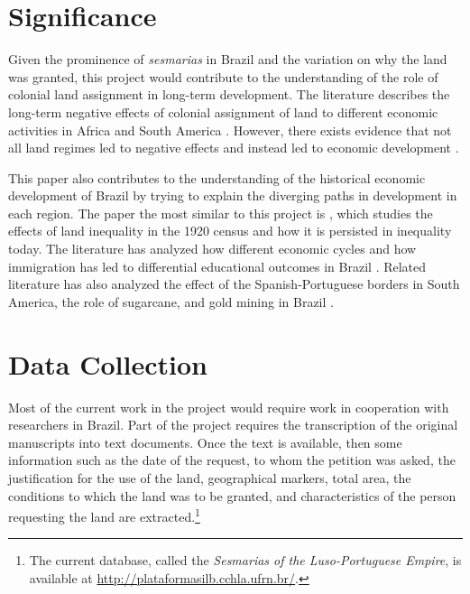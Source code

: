 \documentclass{article}
\begin{document}
\section{Significance}

Given the prominence of \textit{sesmarias} in Brazil and the variation on why the land was granted, this project would contribute to the understanding of the role of colonial land assignment in long-term development.  
The literature describes the long-term negative effects of colonial assignment of land to different economic activities in Africa and South America \parencites{Dell2010-qt}{Lowes2020-pr}.
However, there exists evidence that not all land regimes led to negative effects and instead led to economic development \parencites{Banerjee2005-ki}{Dell2019-np}.  


This paper also contributes to the understanding of the historical economic development of Brazil by trying to explain the diverging paths in development in each region. 
The paper the most similar to this project is \textcite{Wigton-Jones2020-ex}, which studies the effects of land inequality in the 1920 census and how it is persisted in inequality today.
The literature has analyzed how different economic cycles and how immigration has led to differential educational outcomes in Brazil \parencites{Musacchio2014-pq}{Rocha2017-yq}.
Related literature has also analyzed the effect of the Spanish-Portuguese borders in South America, the role of sugarcane, and gold mining in Brazil \parencites{Laudares2022-vy}{Naritomi2012-or}.


\section{Data Collection}

Most of the current work in the project would require work in cooperation with researchers in Brazil. 
Part of the project requires the transcription of the original manuscripts into text documents.
Once the text is available, then some information such as the date of the request, to whom the petition was asked, the justification for the use of the land, geographical markers, total area, the conditions to which the land was to be granted, and characteristics of the person requesting the land are extracted.\footnote{The current database, called the \textit{Sesmarias of the Luso-Portuguese Empire}, is available at \url{http://plataformasilb.cchla.ufrn.br/}.} 
\end{document}
